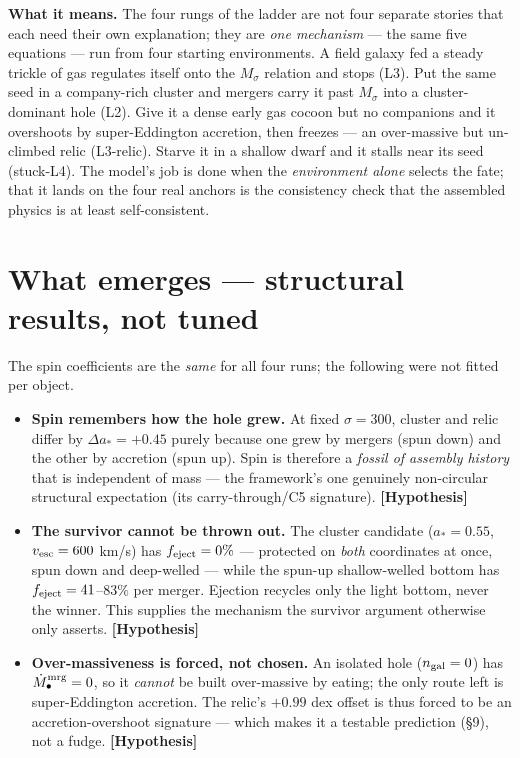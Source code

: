 \documentclass[11pt]{article}
\newcommand{\Hyp}{\textbf{\textcolor{blue!55!black}{[Hypothesis]}}}
\newcommand{\Mbh}{M_{\bullet}}
\newcommand{\Msig}{M_\sigma}
\begin{document}
\textbf{What it means.} The four rungs of the ladder are not four separate stories that each need their own explanation; they are \emph{one mechanism} --- the same five equations --- run from four starting environments. A field galaxy fed a steady trickle of gas regulates itself onto the $\Msig$ relation and stops (L3). Put the same seed in a company-rich cluster and mergers carry it past $\Msig$ into a cluster-dominant hole (L2). Give it a dense early gas cocoon but no companions and it overshoots by super-Eddington accretion, then freezes --- an over-massive but un-climbed relic (L3-relic). Starve it in a shallow dwarf and it stalls near its seed (stuck-L4). The model's job is done when the \emph{environment alone} selects the fate; that it lands on the four real anchors is the consistency check that the assembled physics is at least self-consistent.

\section{What emerges --- structural results, not tuned}
The spin coefficients are the \emph{same} for all four runs; the following were not fitted per object.
\begin{itemize}[leftmargin=1.3em,itemsep=3pt]
\item \textbf{Spin remembers how the hole grew.} At fixed $\sigma=300$, cluster and relic differ by $\Delta a_\ast=+0.45$ purely because one grew by mergers (spun down) and the other by accretion (spun up). Spin is therefore a \emph{fossil of assembly history} that is independent of mass --- the framework's one genuinely non-circular structural expectation (its carry-through/C5 signature). \Hyp
\item \textbf{The survivor cannot be thrown out.} The cluster candidate ($a_\ast=0.55$, $v_{\rm esc}=600$ km/s) has $f_{\rm eject}=0\%$ --- protected on \emph{both} coordinates at once, spun down and deep-welled --- while the spun-up shallow-welled bottom has $f_{\rm eject}=41$--$83\%$ per merger. Ejection recycles only the light bottom, never the winner. This supplies the mechanism the survivor argument otherwise only asserts. \Hyp
\item \textbf{Over-massiveness is forced, not chosen.} An isolated hole ($n_{\rm gal}=0$) has $\dot\Mbh^{\rm mrg}=0$, so it \emph{cannot} be built over-massive by eating; the only route left is super-Eddington accretion. The relic's $+0.99$ dex offset is thus forced to be an accretion-overshoot signature --- which makes it a testable prediction (\S9), not a fudge. \Hyp
\end{itemize}
\end{document}
